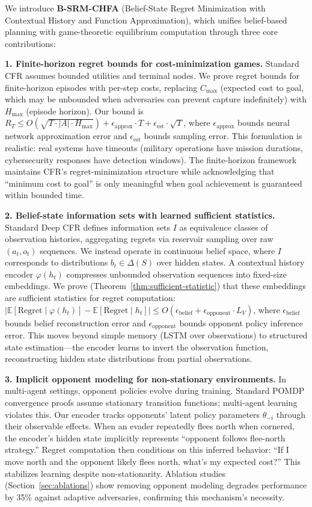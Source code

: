\documentclass{article}
\begin{document}
We introduce \textbf{B-SRM-CHFA} (Belief-State Regret Minimization with Contextual History and Function Approximation), which unifies belief-based planning with game-theoretic equilibrium computation through three core contributions:

\textbf{1. Finite-horizon regret bounds for cost-minimization games.} Standard CFR assumes bounded utilities and terminal nodes. We prove regret bounds for finite-horizon episodes with per-step costs, replacing $C_{\max}$ (expected cost to goal, which may be unbounded when adversaries can prevent capture indefinitely) with $H_{\max}$ (episode horizon). Our bound is $R_T \leq O(\sqrt{T \cdot |A| \cdot H_{\max}}) + \epsilon_{\text{approx}} \cdot T + \epsilon_{\text{est}} \cdot \sqrt{T}$, where $\epsilon_{\text{approx}}$ bounds neural network approximation error and $\epsilon_{\text{est}}$ bounds sampling error. This formulation is realistic: real systems have timeouts (military operations have mission durations, cybersecurity responses have detection windows). The finite-horizon framework maintains CFR's regret-minimization structure while acknowledging that ``minimum cost to goal'' is only meaningful when goal achievement is guaranteed within bounded time.

\textbf{2. Belief-state information sets with learned sufficient statistics.} Standard Deep CFR defines information sets $I$ as equivalence classes of observation histories, aggregating regrets via reservoir sampling over raw $(a_t, o_t)$ sequences. We instead operate in continuous belief space, where $I$ corresponds to distributions $b_t \in \Delta(S)$ over hidden states. A contextual history encoder $\varphi(h_t)$ compresses unbounded observation sequences into fixed-size embeddings. We prove (Theorem~\ref{thm:sufficient-statistic}) that these embeddings are sufficient statistics for regret computation: $|\mathbb{E}[\text{Regret} \mid \varphi(h_t)] - \mathbb{E}[\text{Regret} \mid h_t]| \leq O(\epsilon_{\text{belief}} + \epsilon_{\text{opponent}} \cdot L_V)$, where $\epsilon_{\text{belief}}$ bounds belief reconstruction error and $\epsilon_{\text{opponent}}$ bounds opponent policy inference error. This moves beyond simple memory (LSTM over observations) to structured state estimation---the encoder learns to invert the observation function, reconstructing hidden state distributions from partial observations.

\textbf{3. Implicit opponent modeling for non-stationary environments.} In multi-agent settings, opponent policies evolve during training. Standard POMDP convergence proofs assume stationary transition functions; multi-agent learning violates this. Our encoder tracks opponents' latent policy parameters $\theta_{-i}$ through their observable effects. When an evader repeatedly flees north when cornered, the encoder's hidden state implicitly represents ``opponent follows flee-north strategy.'' Regret computation then conditions on this inferred behavior: ``If I move north and the opponent likely flees north, what's my expected cost?'' This stabilizes learning despite non-stationarity. Ablation studies (Section~\ref{sec:ablations}) show removing opponent modeling degrades performance by 35\% against adaptive adversaries, confirming this mechanism's necessity.
\end{document}
